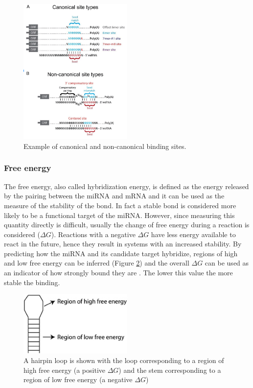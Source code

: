 \begin{figure}[hbt!]
	\centering
	\includegraphics[width=0.5\textwidth]{Figures/canonical_noncanonical}
	\caption{Example of canonical and non-canonical binding sites.}
	\label{fig:canonical_binding}
\end{figure}

\subsubsection{Free energy}
The free energy, also called hybridization energy,  is defined as the energy released by the pairing between the miRNA and mRNA and it can be used as the measure of the stability of the bond. In fact a stable bond is considered more likely to be a functional target of the miRNA. However, since measuring this quantity directly is difficult, usually the change of free energy during a reaction is considered ($\Delta G$). Reactions with a negative $\Delta G$ have less energy available to react in the future, hence they result in systems with an increased stability. By predicting how the miRNA and its candidate target hybridize, regions of high and low free energy can be inferred (Figure \ref{fig:free_energy}) and the overall $\Delta G$ can be used as an indicator of how strongly bound they are \cite{free_energy_survey}. The lower this value the more stable the binding.

\begin{figure}[hbt!]
	\centering
	\includegraphics[width=0.5\textwidth]{Figures/free_energy}
	\caption{A hairpin loop is shown with the loop corresponding to a region of high free energy (a positive $\Delta G$) and the stem corresponding to a region of low free energy (a negative $\Delta G$)}
	\label{fig:free_energy}
\end{figure}

